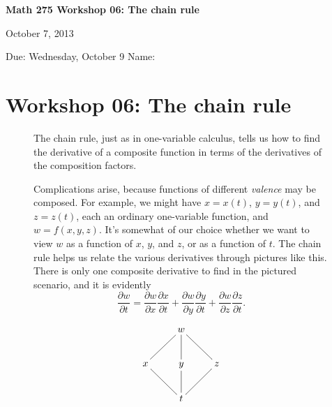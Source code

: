 \documentclass[12pt]{exam}
\theoremstyle{definition}
\begin{document}
\noindent
\textbf{{\large Math 275 \hfill Workshop 06: The chain rule}}

\noindent
October 7, 2013 

\noindent
Due: Wednesday, October 9 \hfill Name: \underline{\hspace{3in}} 

\noindent

\section{Workshop 06: The chain rule}

\begin{figure}[ht]
\begin{minipage}[t]{0.7\linewidth}
The chain rule, just as in one-variable calculus, tells us how to find the derivative of a composite function in terms of the derivatives of the composition factors.

Complications arise, because functions of different \emph{valence} may be composed. For example, we might have $x = x(t)$, $y = y(t)$, and $z = z(t)$, each an ordinary one-variable function, and $w = f(x,y,z)$. It's somewhat of our choice whether we want to view $w$ as a function of $x$, $y$, and $z$, or as a function of $t$. The chain rule helps us relate the various derivatives through pictures like this. There is only one composite derivative to find in the pictured scenario, and it is evidently
\begin{equation*}
    \frac{\partial w}{\partial t} = \frac{\partial w}{\partial x} \frac{\partial x}{\partial t} + \frac{\partial w}{\partial y} \frac{\partial y}{\partial t} + \frac{\partial w}{\partial z} \frac{\partial z}{\partial t}.    
\end{equation*} 
\end{minipage} \hspace*{1cm}
\begin{minipage}[t]{0.25\linewidth}
    \begin{equation*}
        \xymatrix{
              & w \ar@{-}[dl] \ar@{-}[d] \ar@{-}[dr] & \\
            x \ar@{-}[dr] & y \ar@{-}[d] & z \ar@{-}[dl] \\
            & t & 
        }
    \end{equation*}
\end{minipage}
\end{figure}
\end{document}
